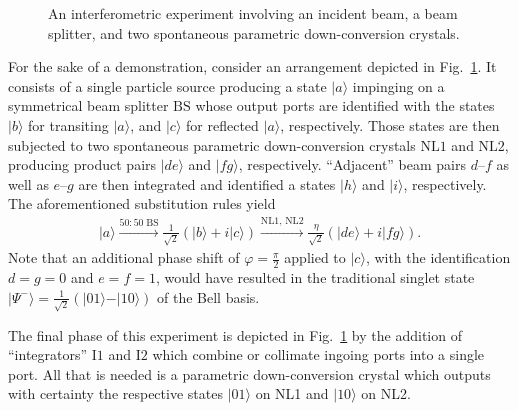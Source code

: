 \documentclass{ws-book9x6}
\begin{document}
\begin{figure}
\begin{center}
\end{center}
\caption{
An interferometric experiment involving an incident beam, a beam splitter, and two spontaneous parametric down-conversion crystals.
\label{2017-etpi-f1}
}
\end{figure}

For the sake of a demonstration, consider an arrangement depicted in Fig.~\ref{2017-etpi-f1}.
It consists of a single particle source producing a state
$\vert a \rangle$
impinging on a symmetrical beam splitter
$\text{BS}$
whose output ports are identified with the states
$\vert b \rangle$  for transiting $\vert a \rangle$, and
$\vert c \rangle$  for reflected $\vert a \rangle$, respectively.
Those states are then subjected to  two
spontaneous parametric down-conversion crystals
$\text{NL1}$ and
$\text{NL2}$, producing product pairs
$\vert d  e \rangle$ and
$\vert f  g \rangle$, respectively.
``Adjacent'' beam pairs $d$--$f$ as well as $e$--$g$
are then integrated and identified a states
$\vert h \rangle$ and
$\vert i \rangle$,
respectively.
The aforementioned substitution rules
yield
\begin{equation}
\begin{split}
 \vert   a   \rangle
\xrightarrow{50:50\; \text{BS}}
\frac{1}{\sqrt{2}}
\left(
\vert b \rangle
+ i
\vert c \rangle
\right)
\xrightarrow{\text{NL1, NL2}}
\frac{\eta }{\sqrt{2}}
\left(
\vert de \rangle
+ i
\vert fg \rangle
\right).
\end{split}
\label{2017-etpi-e2}
\end{equation}
Note that an additional phase shift of $\varphi =\frac{\pi}{2}$ applied to $\vert c \rangle$,
with the identification $d=g=0$ and $e=f=1$,
would have resulted in the traditional singlet state
$\vert \Psi^- \rangle  =
\frac{1}{\sqrt{2}}
\left(
\vert 01 \rangle
-
\vert 10 \rangle
\right)
$ of the Bell basis.

The final phase of this experiment is depicted in Fig.~\ref{2017-etpi-f1} by the addition of ``integrators''
$\text{I1}$
and
$\text{I2}$
which combine or collimate ingoing ports into a single port.
All that is needed is a parametric down-conversion crystal which outputs with certainty the respective states
$\vert 01 \rangle$ on NL1
and
$\vert 10 \rangle$ on NL2.
\end{document}
